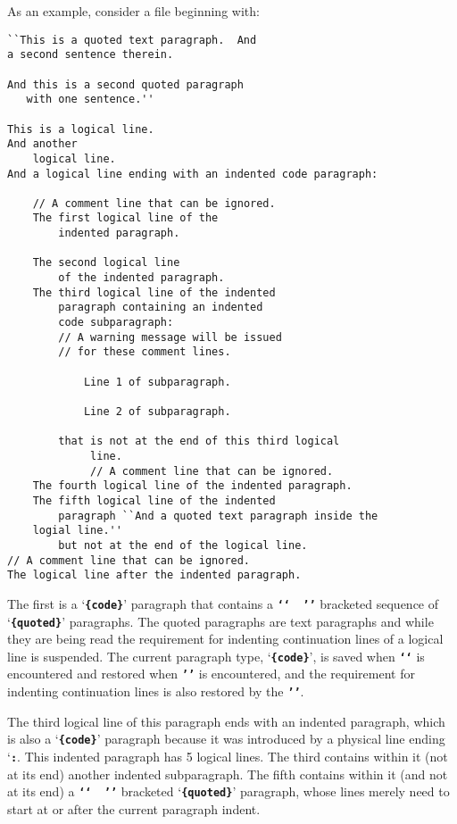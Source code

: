 \documentclass[12pt]{article}
\newcommand{\TT}[1]{{\tt \bfseries #1}}
\newenvironment{indpar}[1][0.3in]%
	{\begin{list}{}%
		     {\setlength{\itemsep}{0in}%
		      \setlength{\topsep}{0in}%
		      \setlength{\parsep}{1ex}%
		      \setlength{\labelwidth}{#1}%
		      \setlength{\leftmargin}{#1}%
		      \addtolength{\leftmargin}{\labelsep}}%
	 \item}%
	{\end{list}}
\begin{document}
As an example, consider a file beginning with:

\begin{indpar}\begin{verbatim}
``This is a quoted text paragraph.  And
a second sentence therein.

And this is a second quoted paragraph
   with one sentence.''

This is a logical line.
And another
    logical line.
And a logical line ending with an indented code paragraph:

    // A comment line that can be ignored.
    The first logical line of the
        indented paragraph.

    The second logical line
        of the indented paragraph.
    The third logical line of the indented
        paragraph containing an indented
        code subparagraph:
        // A warning message will be issued
        // for these comment lines.

            Line 1 of subparagraph.

            Line 2 of subparagraph.

        that is not at the end of this third logical
             line.
             // A comment line that can be ignored.
    The fourth logical line of the indented paragraph.
    The fifth logical line of the indented
        paragraph ``And a quoted text paragraph inside the
    logial line.''
        but not at the end of the logical line.
// A comment line that can be ignored.
The logical line after the indented paragraph.
\end{verbatim}\end{indpar}

The first is a `\TT{\{code\}}' paragraph that contains a \TT{`{}`~~'{}'}
bracketed sequence of `\TT{\{quoted\}}' paragraphs.  The quoted
paragraphs are text paragraphs and while they are being read the
requirement for indenting continuation lines of a logical
line is suspended.  The current paragraph type, `\TT{\{code\}}',
is saved when \TT{`{}`} is encountered and restored when
\TT{'{}'} is encountered, and the requirement for indenting
continuation lines is also restored by the \TT{'{}'}.

The third logical line of this paragraph ends with an indented paragraph,
which is also a `\TT{\{code\}}' paragraph because it was introduced by
a physical line ending `\TT{:}.
This indented paragraph has 5 logical lines.  The third
contains within it (not at its end) another indented subparagraph.
The fifth contains within it (and not at its end) a
\TT{`{}`~~'{}'} bracketed `\TT{\{quoted\}}' paragraph, whose lines
merely need to start at or after the current paragraph indent.
\end{document}
